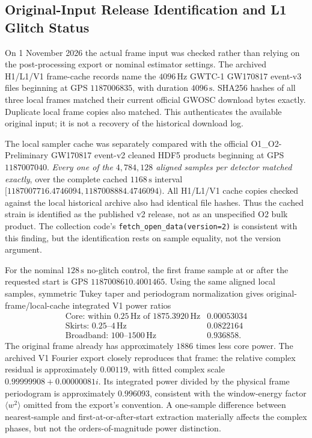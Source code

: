 \subsection{Original-Input Release Identification and L1 Glitch Status}

On 1 November 2026 the actual frame input was checked rather than relying
on the post-processing export or nominal estimator settings. The archived
H1/L1/V1 frame-cache records name the $4096\,\mathrm{Hz}$ GWTC-1
GW170817 event-v3 files beginning at GPS $1187006835$, with duration
$4096\,\mathrm{s}$. SHA256 hashes of all three local frames matched their
current official GWOSC download bytes exactly. Duplicate local frame
copies also matched. This authenticates the available original input;
it is not a recovery of the historical download log.

The local sampler cache was separately compared with the official
O1\_O2-Preliminary GW170817 event-v2 cleaned HDF5 products beginning at
GPS $1187007040$. \emph{Every one of the $4{,}784{,}128$ aligned samples
per detector matched exactly}, over the complete cached
$1168\,\mathrm{s}$ interval
$[1187007716.4746094,1187008884.4746094)$. All H1/L1/V1 cache copies
checked against the local historical archive also had identical file
hashes. Thus the cached strain is identified as the published v2 release,
not as an unspecified O2 bulk product. The collection code's
\texttt{fetch\_open\_data(version=2)} is consistent with this finding,
but the identification rests on sample equality, not the version argument.

For the nominal $128\,\mathrm{s}$ no-glitch control, the first frame
sample at or after the requested start is GPS $1187008610.4001465$.
Using the same aligned local samples, symmetric Tukey taper and
periodogram normalization gives original-frame/local-cache integrated
V1 power ratios
\[
\begin{array}{lr}
\text{Core: within }0.25\,\mathrm{Hz}\text{ of }1875.3920\,\mathrm{Hz}
 & 0.00053034\\
\text{Skirts: }0.25\text{--}4\,\mathrm{Hz} & 0.0822164\\
\text{Broadband: }100\text{--}1500\,\mathrm{Hz} & 0.936858.
\end{array}
\]
The original frame already has approximately $1886$ times less core power.
The archived V1 Fourier export closely reproduces that frame: the relative
complex residual is approximately $0.00119$, with fitted complex scale
$0.99999908+0.00000081i$. Its integrated power divided by the physical
frame periodogram is approximately $0.996093$, consistent with the
window-energy factor $\langle w^2\rangle$ omitted from the export's
convention. A one-sample difference between nearest-sample and
first-at-or-after-start extraction materially affects the complex phases,
but not the orders-of-magnitude power distinction.

